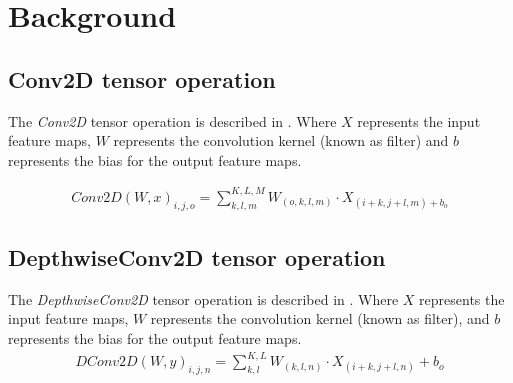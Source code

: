\section{Background}
\label{sec:background}
\subsection{Conv2D tensor operation}
The \emph{Conv2D} tensor operation is described in . Where $X$ represents the input feature maps, $W$ represents the convolution kernel (known as filter) and $b$ represents the bias for the output feature maps\cite{goodfellow2016deep}.

 	\begin{eqnarray} \label{eq:conv2D}
 	Conv2D\left(W,x\right)_{i,j,o}=\sum_{k,l,m}^{K,L,M}W_{(o,k,l,m)} \cdot X_{(i+k,j+l,m)+b_{o}}
 	\end{eqnarray} 	
 	
\subsection{DepthwiseConv2D tensor operation}
The \emph{DepthwiseConv2D} tensor operation is described in . Where $X$ represents the input feature maps, $W$ represents the convolution kernel (known as filter), and $b$ represents the bias for the output feature maps.
 	\begin{eqnarray} \label{eq:dconv2D}
 	DConv2D\left(W,y\right)_{i,j,n}=\sum_{k,l}^{K,L}W_{(k,l,n)} \cdot X_{(i+k,j+l,n)}+b_{o}
 	\end{eqnarray}